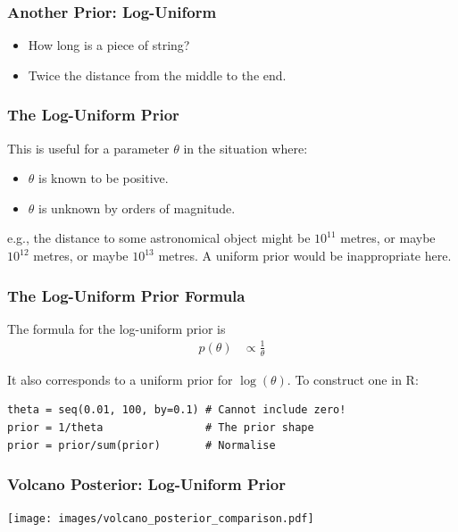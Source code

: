 \documentclass{beamer}
\begin{document}
\begin{frame}
\frametitle{Another Prior: Log-Uniform}

\begin{itemize}
\item How long is a piece of string?\pause
\item Twice the distance from the middle to the end.
\end{itemize}

\end{frame}


\begin{frame}
\frametitle{The Log-Uniform Prior}
This is useful for a parameter $\theta$ in the situation where:

\begin{itemize}
\item $\theta$ is known to be positive.\pause
\item $\theta$ is unknown by orders of magnitude.\pause
\end{itemize}
\vspace{0.5em}
e.g., the distance to some astronomical object might be
$10^{11}$ metres, or maybe $10^{12}$ metres, or maybe $10^{13}$
metres. A uniform prior would be inappropriate here.

\end{frame}



\begin{frame}[fragile]
\frametitle{The Log-Uniform Prior Formula}

The formula for the log-uniform prior is
\begin{align}
p(\theta) &\propto \frac{1}{\theta}
\end{align}

It also corresponds to a uniform prior for $\log(\theta)$.
To construct one in R:
\begin{verbatim}
theta = seq(0.01, 100, by=0.1) # Cannot include zero!
prior = 1/theta                # The prior shape 
prior = prior/sum(prior)       # Normalise
\end{verbatim}

\end{frame}



\begin{frame}[fragile]
\frametitle{Volcano Posterior: Log-Uniform Prior}

\centering
\texttt{[image: images/volcano\_posterior\_comparison.pdf]}


\end{frame}
\end{document}
